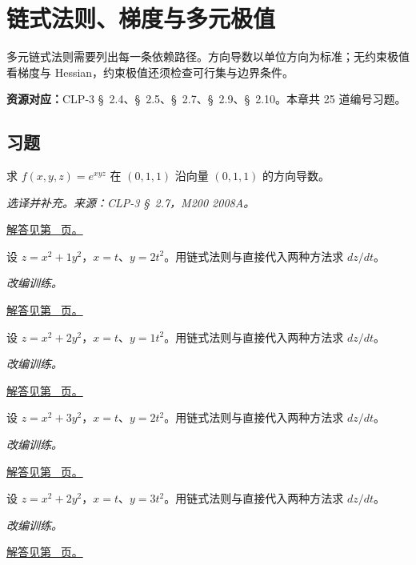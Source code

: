 \documentclass[12pt,fontset=fandol]{ctexart}
\begin{document}
\clearpage
\section{链式法则、梯度与多元极值}\label{sec:ch34}
多元链式法则需要列出每一条依赖路径。方向导数以单位方向为标准；无约束极值看梯度与 Hessian，约束极值还须检查可行集与边界条件。

\textbf{资源对应：}CLP-3 \S~2.4、\S~2.5、\S~2.7、\S~2.9、\S~2.10。本章共 25 道编号习题。
\subsection{习题}
\begin{example}[方向向量必须单位化]\label{ex:c34q1}
求 $f(x,y,z)=e^{xyz}$ 在 $(0,1,1)$ 沿向量 $(0,1,1)$ 的方向导数。
\par\textit{选译并补充。来源：CLP-3 \S~2.7，M200 2008A。}\par\hyperref[ans:c34q1]{解答见第~\pageref{ans:c34q1} 页。}
\end{example}
\begin{example}[复合函数的两种求导路径]\label{ex:c34q2}
设 $z=x^2+1y^2$，$x=t$、$y=2t^2$。用链式法则与直接代入两种方法求 $dz/dt$。
\par\textit{改编训练。}\par\hyperref[ans:c34q2]{解答见第~\pageref{ans:c34q2} 页。}
\end{example}
\begin{example}[复合函数的两种求导路径]\label{ex:c34q3}
设 $z=x^2+2y^2$，$x=t$、$y=1t^2$。用链式法则与直接代入两种方法求 $dz/dt$。
\par\textit{改编训练。}\par\hyperref[ans:c34q3]{解答见第~\pageref{ans:c34q3} 页。}
\end{example}
\begin{example}[复合函数的两种求导路径]\label{ex:c34q4}
设 $z=x^2+3y^2$，$x=t$、$y=2t^2$。用链式法则与直接代入两种方法求 $dz/dt$。
\par\textit{改编训练。}\par\hyperref[ans:c34q4]{解答见第~\pageref{ans:c34q4} 页。}
\end{example}
\begin{example}[复合函数的两种求导路径]\label{ex:c34q5}
设 $z=x^2+2y^2$，$x=t$、$y=3t^2$。用链式法则与直接代入两种方法求 $dz/dt$。
\par\textit{改编训练。}\par\hyperref[ans:c34q5]{解答见第~\pageref{ans:c34q5} 页。}
\end{example}
\end{document}
